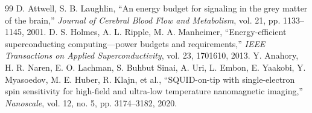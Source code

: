 \documentclass[10pt,twocolumn,letterpaper]{article}
\begin{document}
\begin{thebibliography}{99}
 D. Attwell, S. B. Laughlin, ``An energy budget for signaling in the grey matter of the brain,'' \textit{Journal of Cerebral Blood Flow and Metabolism}, vol. 21, pp. 1133--1145, 2001.
 D. S. Holmes, A. L. Ripple, M. A. Manheimer, ``Energy-efficient superconducting computing—power budgets and requirements,'' \textit{IEEE Transactions on Applied Superconductivity}, vol. 23, 1701610, 2013.
 Y. Anahory, H. R. Naren, E. O. Lachman, S. Buhbut Sinai, A. Uri, L. Embon, E. Yaakobi, Y. Myasoedov, M. E. Huber, R. Klajn, et al., ``SQUID-on-tip with single-electron spin sensitivity for high-field and ultra-low temperature nanomagnetic imaging,'' \textit{Nanoscale}, vol. 12, no. 5, pp. 3174--3182, 2020.
\end{thebibliography}
\end{document}
